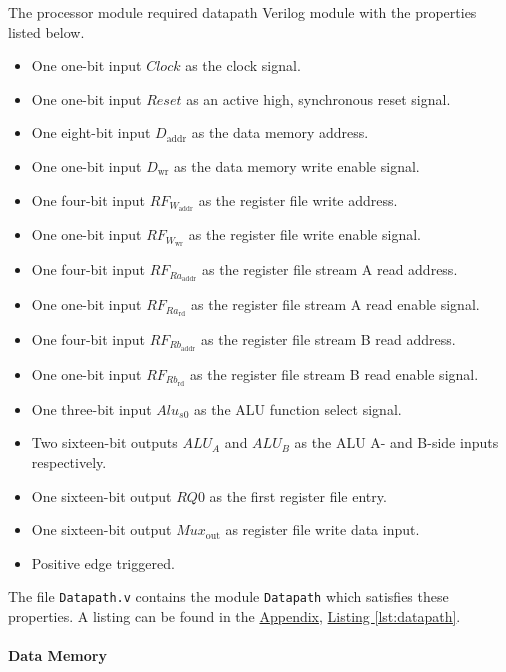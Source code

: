 The processor module required datapath Verilog module with the properties listed below.

\begin{itemize}
    \item One one-bit input $Clock$ as the clock signal.
    \item One one-bit input $Reset$ as an active high, synchronous reset signal.
    \item One eight-bit input $D_\text{addr}$ as the data memory address.
    \item One one-bit input $D_\text{wr}$ as the data memory write enable signal.
    \item One four-bit input $RF_{W_\text{addr}}$ as the register file write address.
    \item One one-bit input $RF_{W_\text{wr}}$ as the register file write enable signal.
    \item One four-bit input $RF_{Ra_\text{addr}}$ as the register file stream A read address.
    \item One one-bit input $RF_{Ra_\text{rd}}$ as the register file stream A read enable signal.
    \item One four-bit input $RF_{Rb_\text{addr}}$ as the register file stream B read address.
    \item One one-bit input $RF_{Rb_\text{rd}}$ as the register file stream B read enable signal.
    \item One three-bit input $Alu_{s0}$ as the ALU function select signal.
    \item Two sixteen-bit outputs $ALU_A$ and $ALU_B$ as the ALU A- and B-side inputs respectively.
    \item One sixteen-bit output $RQ0$ as the first register file entry.
    \item One sixteen-bit output $Mux_\text{out}$ as register file write data input.
    \item Positive edge triggered.
\end{itemize}

The file \verb|Datapath.v| contains the module \verb|Datapath| which satisfies these properties.
A listing can be found in the \hyperref[sec:appendix]{Appendix}, \hyperref[lst:datapath]{Listing \ref*{lst:datapath}}.

\paragraph{Data Memory} \label{par:regmem}

